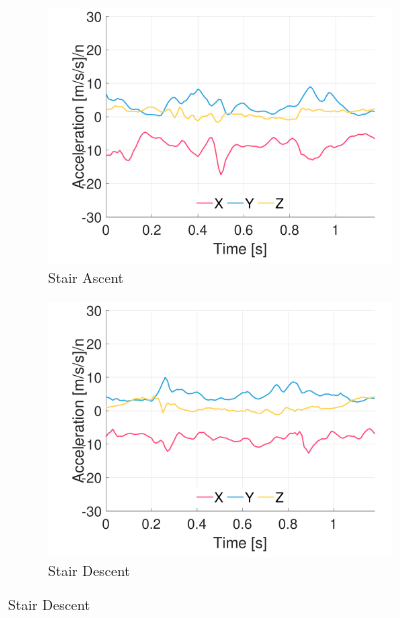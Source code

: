 \begin{figure}[p]
    \begin{subfigure}[b]{0.49\textwidth}
         \centering
         \includegraphics[width=\textwidth]{content/3-Methods/example-data/ch3_example_data_subject_01_l_hip_accel_activity_stair_down.pdf}
         \caption{Stair Ascent}
    \end{subfigure}
    \begin{subfigure}[b]{0.49\textwidth}
         \centering
         \includegraphics[width=\textwidth]{content/3-Methods/example-data/ch3_example_data_subject_01_l_hip_accel_activity_stair_up.pdf}
         \caption{Stair Descent}
    \end{subfigure}
    

\end{figure}
